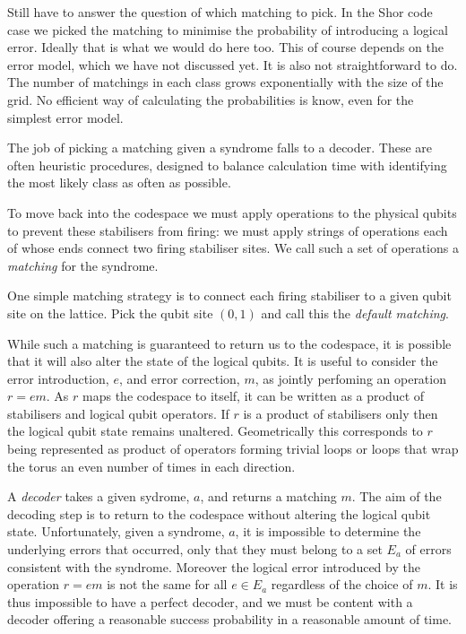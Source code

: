 Still have to answer the question of which matching to pick. In the Shor code case we picked the matching to minimise the probability of introducing a logical error. Ideally that is what we would do here too. This of course depends on the error model, which we have not discussed yet. It is also not straightforward to do. The number of matchings in each class grows exponentially with the size of the grid. No efficient way of calculating the probabilities is know, even for the simplest error model.

The job of picking a matching given a syndrome falls to a decoder. These are often heuristic procedures, designed to balance calculation time with identifying the most likely class as often as possible. 
























To move back into the codespace we must apply operations to the physical qubits to prevent these stabilisers from firing: we must apply strings of operations each of whose ends connect two firing stabiliser sites. We call such a set of operations a \textit{matching} for the syndrome.

One simple matching strategy is to connect each firing stabiliser to a given qubit site on the lattice. Pick the qubit site $(0,1)$ and call this the \textit{default matching}.

While such a matching is guaranteed to return us to the codespace, it is possible that it will also alter the state of the logical qubits. It is useful to consider the error introduction, $e$, and error correction, $m$, as jointly perfoming an operation $r=em$. As $r$ maps the codespace to itself, it can be written as a product of stabilisers and logical qubit operators. If $r$ is a product of stabilisers only then the logical qubit state remains unaltered. Geometrically this corresponds to $r$ being represented as product of operators forming trivial loops or loops that wrap the torus an even number of times in each direction. 

A \textit{decoder} takes a given sydrome, $a$, and returns a matching $m$. The aim of the decoding step is to return to the codespace without altering the logical qubit state. Unfortunately, given a syndrome, $a$, it is impossible to determine the underlying errors that occurred, only that they must belong to a set $E_a$ of errors consistent with the syndrome. Moreover the logical error introduced by the operation $r = em$ is not the same for all $e \in E_a$ regardless of the choice of $m$. It is thus impossible to have a perfect decoder, and we must be content with a decoder offering a reasonable success probability in a reasonable amount of time.


